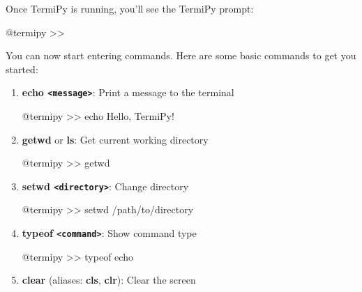 \documentclass[
  letterpaper,
  DIV=11,
  numbers=noendperiod]{scrreprt}
\newenvironment{Shaded}{\begin{snugshade}}{\end{snugshade}}
\newcommand{\ExtensionTok}[1]{\textcolor[rgb]{0.00,0.23,0.31}{#1}}
\newcommand{\NormalTok}[1]{\textcolor[rgb]{0.00,0.23,0.31}{#1}}
\newcommand{\OperatorTok}[1]{\textcolor[rgb]{0.37,0.37,0.37}{#1}}
\begin{document}
Once TermiPy is running, you'll see the TermiPy prompt:

\begin{Shaded}
\begin{Highlighting}[]
\ExtensionTok{@termipy} \OperatorTok{\textgreater{}\textgreater{}}
\end{Highlighting}
\end{Shaded}

You can now start entering commands. Here are some basic commands to get
you started:

\begin{enumerate}
\def\labelenumi{\arabic{enumi}.}
\item
  \textbf{echo \texttt{\textless{}message\textgreater{}}}: Print a
  message to the terminal

\begin{Shaded}
\begin{Highlighting}[]
\ExtensionTok{@termipy} \OperatorTok{\textgreater{}\textgreater{}}\NormalTok{ echo Hello, TermiPy!}
\end{Highlighting}
\end{Shaded}
\item
  \textbf{getwd} or \textbf{ls}: Get current working directory

\begin{Shaded}
\begin{Highlighting}[]
\ExtensionTok{@termipy} \OperatorTok{\textgreater{}\textgreater{}}\NormalTok{ getwd}
\end{Highlighting}
\end{Shaded}
\item
  \textbf{setwd \texttt{\textless{}directory\textgreater{}}}: Change
  directory

\begin{Shaded}
\begin{Highlighting}[]
\ExtensionTok{@termipy} \OperatorTok{\textgreater{}\textgreater{}}\NormalTok{ setwd /path/to/directory}
\end{Highlighting}
\end{Shaded}
\item
  \textbf{typeof \texttt{\textless{}command\textgreater{}}}: Show
  command type

\begin{Shaded}
\begin{Highlighting}[]
\ExtensionTok{@termipy} \OperatorTok{\textgreater{}\textgreater{}}\NormalTok{ typeof echo}
\end{Highlighting}
\end{Shaded}
\item
  \textbf{clear} (aliases: \textbf{cls}, \textbf{clr}): Clear the screen


\end{enumerate}
\end{document}
